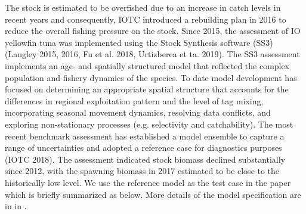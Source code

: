 {The stock is estimated to be overfished due to an increase in catch levels in recent years and consequently, IOTC introduced a rebuilding plan in 2016 to reduce the overall fishing pressure on the stock. Since 2015, the assessment of IO yellowfin tuna was implemented using the Stock Synthesis software (SS3) (Langley 2015, 2016, Fu et al. 2018, Urtizberea et ta. 2019). The SS3 assessment implements an age- and spatially structured model that reflected the complex population and fishery dynamics of the species. To date model development has focused on determining an appropriate spatial structure that accounts for the differences in regional exploitation pattern and the level of tag mixing, incorporating seasonal movement dynamics, resolving data conflicts, and exploring non-stationary processes (e.g. selectivity and catchability).  The most recent benchmark assessment \cite{fu2018yft} has established a model ensemble to capture a range of uncertainties and adopted a reference case for diagnostics purposes (IOTC 2018). The assessment indicated stock biomass declined substantially since 2012, with the spawning biomass in 2017 estimated to be close to the historically low level. We use the reference model as the test case in the paper which is briefly summarized as below.  More details of the model specification are in in \cite{fu2018yft}.

}
